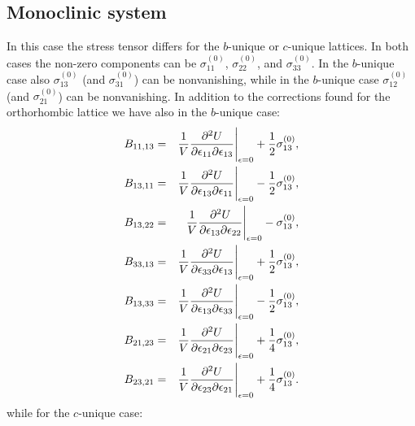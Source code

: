 \documentclass[12pt,a4paper]{article}
\begin{document}
\subsection{\color{web-blue}Monoclinic system}
In this case the stress tensor differs for the $b$-unique or $c$-unique
lattices. In both cases the non-zero components can be $\sigma^{(0)}_{11}$, 
$\sigma^{(0)}_{22}$, and $\sigma^{(0)}_{33}$. In the $b$-unique case 
also $\sigma^{(0)}_{13}$ (and $\sigma^{(0)}_{31}$) can be nonvanishing, 
while in the $b$-unique case $\sigma^{(0)}_{12}$ 
(and $\sigma^{(0)}_{21}$) can be nonvanishing.
In addition to the corrections found for the orthorhombic lattice 
we have also in the $b$-unique case:
\begin{eqnarray}
B_{11,13} &=& {1 \over V}{\partial^2 U \over \partial \epsilon_{11}
\partial \epsilon_{13}}\Bigg|_{\epsilon=0} +{1\over 2}\sigma^{(0)}_{13}, \\
B_{13,11} &=& {1 \over V}{\partial^2 U \over \partial \epsilon_{13}
\partial \epsilon_{11}}\Bigg|_{\epsilon=0} -{1\over 2}\sigma^{(0)}_{13}, \\
B_{13,22} &=& {1 \over V}{\partial^2 U \over \partial \epsilon_{13}
\partial \epsilon_{22}}\Bigg|_{\epsilon=0} -\sigma^{(0)}_{13}, \\
B_{33,13} &=& {1 \over V}{\partial^2 U \over \partial \epsilon_{33}
\partial \epsilon_{13}}\Bigg|_{\epsilon=0} +{1\over 2}\sigma^{(0)}_{13}, \\
B_{13,33} &=& {1 \over V}{\partial^2 U \over \partial \epsilon_{13}
\partial \epsilon_{33}}\Bigg|_{\epsilon=0} -{1\over 2}\sigma^{(0)}_{13}, \\
B_{21,23} &=& {1 \over V}{\partial^2 U \over \partial \epsilon_{21}
\partial \epsilon_{23}}\Bigg|_{\epsilon=0} + {1\over 4}\sigma^{(0)}_{13}, \\
B_{23,21} &=& {1 \over V}{\partial^2 U \over \partial \epsilon_{23}
\partial \epsilon_{21}}\Bigg|_{\epsilon=0} +{1\over 4}\sigma^{(0)}_{13}. 
\end{eqnarray}
while for the $c$-unique case:
\end{document}
